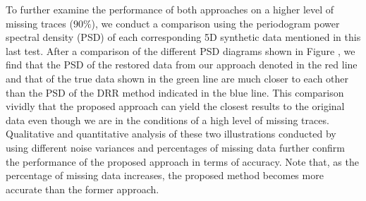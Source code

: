 
To further examine the performance of both approaches on a higher level of missing traces ($90\%$), we conduct a comparison using the periodogram power spectral density (PSD) of each corresponding 5D synthetic data mentioned in this last test. After a comparison of the different PSD diagrams shown in Figure \dlo{\ref{fig:21}}\wen{\ref{fig:Periodogrampsdcomparison9002}}, we find that the PSD of the restored data from our approach denoted in the red line and that of the true data shown in the green line are much closer to each other than the PSD of the DRR method indicated in  the blue line. This comparison vividly  that the proposed approach can yield the closest results to the original data\wen{,} even though we are in the conditions of a high level of missing traces.\\
Qualitative and quantitative analysis of these two illustrations conducted by using different noise variances and percentages of missing data further confirm the performance of the proposed approach in terms of accuracy. Note that, as the percentage of missing data increases, the proposed method becomes more accurate than the former approach.


